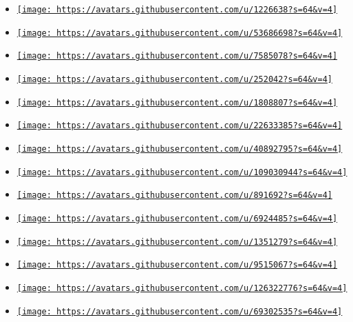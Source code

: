 \begin{itemize}
\item
  \href{https://github.com/artemist}{\texttt{[image: https://avatars.githubusercontent.com/u/1226638?s=64\&v=4]}}
\item
  \href{https://github.com/astrale-sharp}{\texttt{[image: https://avatars.githubusercontent.com/u/53686698?s=64\&v=4]}}
\item
  \href{https://github.com/cmoog}{\texttt{[image: https://avatars.githubusercontent.com/u/7585078?s=64\&v=4]}}
\item
  \href{https://github.com/drupol}{\texttt{[image: https://avatars.githubusercontent.com/u/252042?s=64\&v=4]}}
\item
  \href{https://github.com/dyc3}{\texttt{[image: https://avatars.githubusercontent.com/u/1808807?s=64\&v=4]}}
\item
  \href{https://github.com/eltociear}{\texttt{[image: https://avatars.githubusercontent.com/u/22633385?s=64\&v=4]}}
\item
  \href{https://github.com/emilyyyylime}{\texttt{[image: https://avatars.githubusercontent.com/u/40892795?s=64\&v=4]}}
\item
  \href{https://github.com/emmett-rayes}{\texttt{[image: https://avatars.githubusercontent.com/u/109030944?s=64\&v=4]}}
\item
  \href{https://github.com/espinielli}{\texttt{[image: https://avatars.githubusercontent.com/u/891692?s=64\&v=4]}}
\item
  \href{https://github.com/evfinkn}{\texttt{[image: https://avatars.githubusercontent.com/u/6924485?s=64\&v=4]}}
\item
  \href{https://github.com/f3rn0s}{\texttt{[image: https://avatars.githubusercontent.com/u/1351279?s=64\&v=4]}}
\item
  \href{https://github.com/freundTech}{\texttt{[image: https://avatars.githubusercontent.com/u/9515067?s=64\&v=4]}}
\item
  \href{https://github.com/geekvest}{\texttt{[image: https://avatars.githubusercontent.com/u/126322776?s=64\&v=4]}}
\item
  \href{https://github.com/h-arry-smith}{\texttt{[image: https://avatars.githubusercontent.com/u/69302535?s=64\&v=4]}}

\end{itemize}
